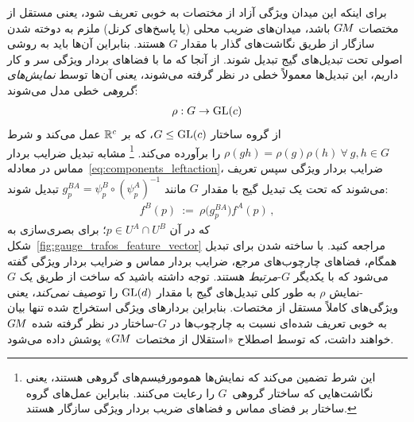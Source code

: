 				برای اینکه این میدان ویژگی آزاد از مختصات به خوبی تعریف شود، یعنی مستقل از مختصات $G\mkern-1.4muM$ باشد، میدان‌های ضریب محلی (یا پاسخ‌های کرنل) ملزم به دوخته شدن سازگار از طریق نگاشت‌های گذار با مقدار $G$ هستند.
				بنابراین آن‌ها باید به روشی اصولی تحت تبدیل‌های گیج تبدیل شوند.
				از آنجا که ما با فضاهای بردار ویژگی سر و کار داریم، این تبدیل‌ها معمولاً خطی در نظر گرفته می‌شوند، یعنی آن‌ها توسط \emph{نمایش‌های گروهی} خطی مدل می‌شوند:
				\begin{align}\label{eq:group_representation}
					\rho:G\to\operatorname{GL}(c)
				\end{align}
				از گروه ساختار $G\leq\operatorname{GL}(c)$، که بر $\mathbb{R}^c$ عمل می‌کند و شرط $\rho(gh)=\rho(g)\rho(h)\ \forall\ g,h\in G$ را برآورده می‌کند.%
				\footnote{\label{footnote:repr_group_homomorphism}
					این شرط تضمین می‌کند که نمایش‌ها همومورفیسم‌های گروهی هستند، یعنی نگاشت‌هایی که ساختار گروهی~$G$ را رعایت می‌کنند.
					بنابراین عمل‌های گروه ساختار بر فضای مماس و فضاهای ضریب بردار ویژگی سازگار هستند.
				}
				مشابه تبدیل ضرایب بردار مماس در معادله~\eqref{eq:components_leftaction}، ضرایب بردار ویژگی سپس تعریف می‌شوند که تحت یک تبدیل گیج با مقدار $G$ مانند $g_p^{BA}=\psi_p^B\!\circ\!\left(\psi_p^A\right)^{-1}$ تبدیل شوند:
				\begin{align}\label{eq:gauge_trafo_features}
					f^B(p)\ :=\ \rho\big( g_p^{BA}\big) f^A(p) \,,
				\end{align}
				که در آن $p\in U^A\cap U^B$؛ برای بصری‌سازی به شکل~\ref{fig:gauge_trafos_feature_vector} مراجعه کنید.
				با ساخته شدن برای تبدیل همگام، فضاهای چارچوب‌های مرجع، ضرایب بردار مماس و ضرایب بردار ویژگی گفته می‌شود که با یکدیگر $G$-\emph{مرتبط} هستند.
				توجه داشته باشید که ساخت از طریق یک $G$-نمایش $\rho$ به طور کلی تبدیل‌های گیج با مقدار $\operatorname{GL}(d)$ را توصیف \emph{نمی‌کند}، یعنی ویژگی‌های کاملاً مستقل از مختصات.
				بنابراین بردارهای ویژگی استخراج شده تنها بیان به خوبی تعریف شده‌ای نسبت به چارچوب‌ها در $G$-ساختار در نظر گرفته شده $G\mkern-1.4muM$ خواهند داشت، که توسط اصطلاح «استقلال از مختصات $G\mkern-1.4muM$» پوشش داده می‌شود.
				
